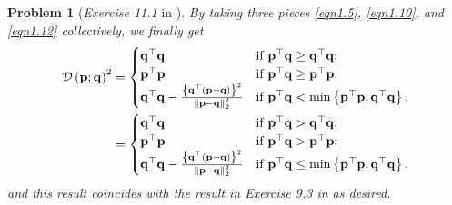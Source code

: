 \documentclass[11pt]{article}
\newtheorem{problem}{Problem}
\numberwithin{equation}{problem}
\begin{document}
\begin{problem} [\emph{Exercise 11.1} in \cite{calafiore2014optimization}]
{\indent By taking three pieces \eqref{eqn1.5}, \eqref{eqn1.10}, and \eqref{eqn1.12} collectively, we finally get
\begin{equation*}
    \begin{split}
        \mathcal{D} \left( \mathbf{p}; \mathbf{q} \right)^2 &=
        \begin{cases}
            \mathbf{q}^{\top} \mathbf{q} & \textnormal{if } \mathbf{p}^{\top} \mathbf{q} \geq \mathbf{q}^{\top} \mathbf{q}; \\
            \mathbf{p}^{\top} \mathbf{p} & \textnormal{if } \mathbf{p}^{\top} \mathbf{q} \geq \mathbf{p}^{\top} \mathbf{p}; \\
            \mathbf{q}^{\top} \mathbf{q}
            - \frac{\left\{ \mathbf{q}^{\top} \left( \mathbf{p} - \mathbf{q} \right) \right\}^2}{\left\| \mathbf{p} - \mathbf{q} \right\|_{2}^2} & \textnormal{if } \mathbf{p}^{\top} \mathbf{q} < \min \left\{ \mathbf{p}^{\top} \mathbf{p}, \mathbf{q}^{\top} \mathbf{q} \right\},
        \end{cases} \\
        &=
        \begin{cases}
            \mathbf{q}^{\top} \mathbf{q} & \textnormal{if } \mathbf{p}^{\top} \mathbf{q} > \mathbf{q}^{\top} \mathbf{q}; \\
            \mathbf{p}^{\top} \mathbf{p} & \textnormal{if } \mathbf{p}^{\top} \mathbf{q} > \mathbf{p}^{\top} \mathbf{p}; \\
            \mathbf{q}^{\top} \mathbf{q}
            - \frac{\left\{ \mathbf{q}^{\top} \left( \mathbf{p} - \mathbf{q} \right) \right\}^2}{\left\| \mathbf{p} - \mathbf{q} \right\|_{2}^2} & \textnormal{if } \mathbf{p}^{\top} \mathbf{q} \leq \min \left\{ \mathbf{p}^{\top} \mathbf{p}, \mathbf{q}^{\top} \mathbf{q} \right\},
        \end{cases}
    \end{split}
\end{equation*}
and this result coincides with the result in  \emph{Exercise 9.3} in \cite{calafiore2014optimization} as desired.
}
\end{problem}
\end{document}
